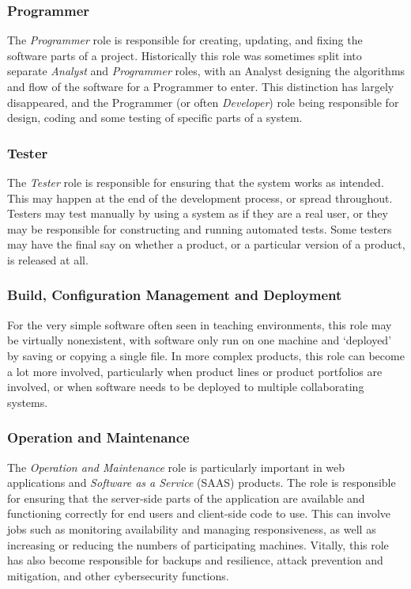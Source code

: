 \subsubsection{Programmer}
The \emph{Programmer} role is responsible for creating, updating, and fixing the software parts of a project. Historically this role was sometimes split into separate \emph{Analyst} and \emph{Programmer} roles, with an Analyst designing the algorithms and flow of the software for a Programmer to enter. This distinction has largely disappeared, and the Programmer (or often \emph{Developer}) role being responsible for design, coding and some testing of specific parts of a system.

\subsubsection{Tester}
The \emph{Tester} role is responsible for ensuring that the system works as intended. This may happen at the end of the development process, or spread throughout. Testers may test manually by using a system as if they are a real user, or they may be responsible for constructing and running automated tests. Some testers may have the final say on whether a product, or a particular version of a product, is released at all.

\subsubsection{Build, Configuration Management and Deployment}
For the very simple software often seen in teaching environments, this role may be virtually nonexistent, with software only run on one machine and `deployed' by saving or copying a single file. In more complex products, this role can become a lot more involved, particularly when product lines or product portfolios are involved, or when software needs to be deployed to multiple collaborating systems.

\subsubsection{Operation and Maintenance}
The \emph{Operation and Maintenance} role is particularly important in web applications and \emph{Software as a Service} (SAAS) products. The role is responsible for ensuring that the server-side parts of the application are available and functioning correctly for end users and client-side code to use. This can involve jobs such as monitoring availability and managing responsiveness, as well as increasing or reducing the numbers of participating machines. Vitally, this role has also become responsible for backups and resilience, attack prevention and mitigation, and other cybersecurity functions.

